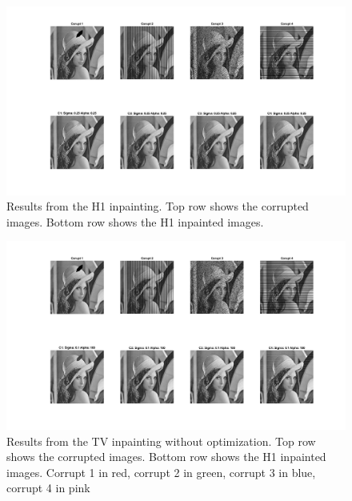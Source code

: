 \documentclass[12pt]{article}
\begin{document}
\begin{figure}[H]
	
	
	\hspace{-1.5in}
	\includegraphics[width = 1.4\textwidth]{Figures/H1Results.png}
	\caption{Results from the H1 inpainting. Top row shows the corrupted images. Bottom row shows the H1 inpainted images.}
	\label{fig:H1}
\end{figure}
\begin{figure}[H]
	
	
	\hspace{-1.5in}
	\includegraphics[width = 1.4\textwidth]{Figures/TVResults_nooptimize.png}
	\caption{Results from the TV inpainting without optimization. Top row shows the corrupted images. Bottom row shows the H1 inpainted images. Corrupt 1 in red, corrupt 2 in green, corrupt 3 in blue, corrupt 4 in pink}
	\label{fig:TV1_noopt}
\end{figure}
\end{document}
